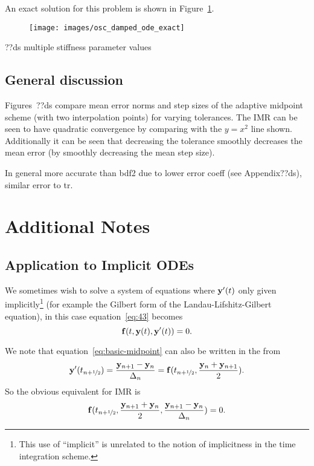 An exact solution for this problem is shown in Figure~\ref{fig:imr-stiff-exact}.

\begin{figure}[h!]
  \centering
  \texttt{[image: images/osc\_damped\_ode\_exact]}
  \caption{}
  \label{fig:imr-stiff-exact}
\end{figure}

??ds multiple stiffness parameter values


\subsection{General discussion}
\label{sec:aimr-general-discussion}

Figures~??ds compare mean error norms and step sizes of the adaptive midpoint scheme (with two interpolation points) for varying tolerances.
The IMR can be seen to have quadratic convergence by comparing with the $y=x^2$ line shown.
Additionally it can be seen that decreasing the tolerance smoothly decreases the mean error (by smoothly decreasing the mean step size).

In general more accurate than bdf2 due to lower error coeff (see Appendix??ds), similar error to tr.

\section{Additional Notes}

\subsection{Application to Implicit ODEs}
\label{sec:extens-impl-odes}

We sometimes wish to solve a system of equations where $\mathbf{y}'(t)$ only given implicitly\footnote{This use of ``implicit'' is unrelated to the notion of implicitness in the time integration scheme.} (for example the Gilbert form of the Landau-Lifshitz-Gilbert equation), in this case equation~\eqref{eq:43} becomes
\begin{equation}
  {\mathbf{f}}(t, \mathbf{y}(t), \mathbf{y}'(t)) = 0.
\end{equation}

We note that equation~\eqref{eq:basic-midpoint} can also be written in the from
\begin{equation}
  \mathbf{y}'(t_{n+\nicefrac{1}{2}}) = \frac{\mathbf{y}_{n+1} - \mathbf{y}_n}{\Delta_{n}} =  {\mathbf{f}}(t_{n+\nicefrac{1}{2}}, \frac{\mathbf{y}_n + \mathbf{y}_{n+1}}{2}).
\end{equation}
So the obvious equivalent for IMR is
\begin{equation}
  {\mathbf{f}}(t_{n+\nicefrac{1}{2}}, \frac{\mathbf{y}_{n+1} + \mathbf{y}_n}{2}, \frac{\mathbf{y}_{n+1} - \mathbf{y}_n}{\Delta_{n}}) = 0.
\end{equation}

